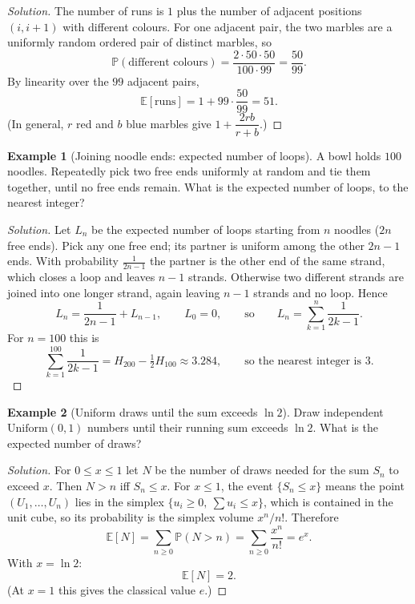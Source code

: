 \documentclass[11pt]{article}
\theoremstyle{definition}
\newtheorem{example}{Example}[section]
\newcommand{\E}{\mathbb{E}}
\begin{document}
\begin{proof}[Solution]
The number of runs is $1$ plus the number of adjacent positions $(i,i+1)$ with different colours. For one adjacent pair, the two marbles are a uniformly random ordered pair of distinct marbles, so
\[
\mathbb P(\text{different colours})=\frac{2\cdot50\cdot50}{100\cdot99}=\frac{50}{99}.
\]
By linearity over the $99$ adjacent pairs,
\[
\E[\text{runs}]=1+99\cdot\frac{50}{99}=\boxed{51}.
\]
(In general, $r$ red and $b$ blue marbles give $1+\dfrac{2rb}{r+b}$.)
\end{proof}

\begin{example}[Joining noodle ends: expected number of loops]
A bowl holds $100$ noodles. Repeatedly pick two free ends uniformly at random and tie them together, until no free ends remain. What is the expected number of loops, to the nearest integer?
\end{example}

\begin{proof}[Solution]
Let $L_n$ be the expected number of loops starting from $n$ noodles ($2n$ free ends). Pick any one free end; its partner is uniform among the other $2n-1$ ends. With probability $\tfrac1{2n-1}$ the partner is the other end of the same strand, which closes a loop and leaves $n-1$ strands. Otherwise two different strands are joined into one longer strand, again leaving $n-1$ strands and no loop. Hence
\[
L_n=\frac1{2n-1}+L_{n-1},\qquad L_0=0,\qquad\text{so}\qquad L_n=\sum_{k=1}^{n}\frac1{2k-1}.
\]
For $n=100$ this is
\[
\sum_{k=1}^{100}\frac1{2k-1}=H_{200}-\tfrac12H_{100}\approx3.284,\qquad\text{so the nearest integer is }\boxed{3}.
\]
\end{proof}

\begin{example}[Uniform draws until the sum exceeds $\ln 2$]
Draw independent $\mathrm{Uniform}(0,1)$ numbers until their running sum exceeds $\ln2$. What is the expected number of draws?
\end{example}

\begin{proof}[Solution]
For $0\le x\le1$ let $N$ be the number of draws needed for the sum $S_n$ to exceed $x$. Then $N>n$ iff $S_n\le x$. For $x\le1$, the event $\{S_n\le x\}$ means the point $(U_1,\dots,U_n)$ lies in the simplex $\{u_i\ge0,\ \sum u_i\le x\}$, which is contained in the unit cube, so its probability is the simplex volume $x^n/n!$. Therefore
\[
\E[N]=\sum_{n\ge0}\mathbb P(N>n)=\sum_{n\ge0}\frac{x^n}{n!}=e^x.
\]
With $x=\ln2$:
\[
\boxed{\E[N]=2}.
\]
(At $x=1$ this gives the classical value $e$.)
\end{proof}
\end{document}
